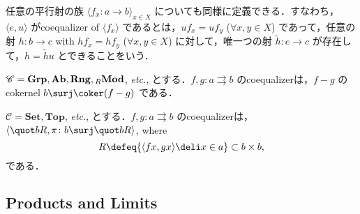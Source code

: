 \documentclass{naughieLuatex}
\newcommand\cat\mathscr
\newcommand\opair[2]{\langle #1, #2 \rangle}
\newcommand\ext\tilde
\newcommand\genby[1]{\langle #1 \rangle}
\newcommand\fmly\genby
\newcommand\etcetra{\emph{etc.}}
\newcommand\catb\mathbf
\newcommand\Set{\catb{Set}}
\newcommand\Grp{\catb{Grp}}
\newcommand\Mod{\catb{Mod}}
\newcommand\lMod[1][R]{\vphantom{\Mod}_{#1} \Mod}
\newcommand\Tops{\catb{Top}}
\newcommand\Ab{\catb{Ab}}
\newcommand\Rng{\catb{Rng}}
\begin{document}
任意の平行射の族 $\fmly{f_x \colon a \to b}_{x \in X}$ についても同様に定義できる．すなわち，$\opair e u$ がcoequalizer of $\fmly{f_x}$ であるとは，$u f_x = u f_y$ ($\forall x, y \in X$) であって，任意の射 $h \colon b \to c$ with $h f_x = h f_y$ ($\forall x, y \in X$) に対して，唯一つの射 $\ext h \colon e \to c$ が存在して，$h = \ext h u$ とできることをいう．

\begin{exs}
\item $\cat C = \Grp, \Ab, \Rng, \lMod$, \etcetra, とする．$f, g \colon a \rightrightarrows b$ のcoequalizerは，$f - g$ のcokernel $b \surj \coker (f - g)$ である．
\item $\cat C = \Set, \Tops$, \etcetra, とする．$f, g \colon a \rightrightarrows b$ のcoequalizerは，$\opair{\quot b R}{\pi \colon b \surj \quot b R}$, where
  \[
    R \defeq \{ \opair{f x}{g x} \deli x \in a \} \subset b \times b,
  \]
  である．
\end{exs}

\subsection{Products and Limits}
\end{document}
